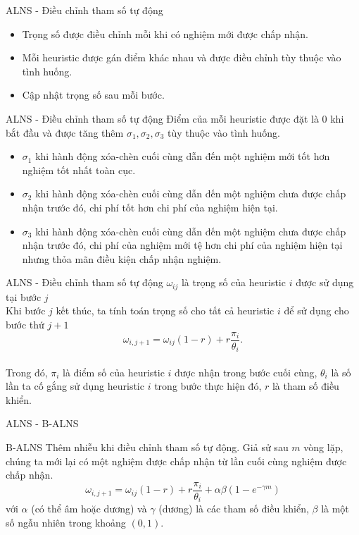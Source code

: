 \begin{frame}{ALNS - Điều chỉnh tham số tự động}
  \begin{itemize}
    \item Trọng số được điều chỉnh mỗi khi có nghiệm mới được chấp nhận.
    \item Mỗi heuristic được gán điểm khác nhau và được điều chỉnh tùy thuộc vào tình huống.
    \item Cập nhật trọng số sau mỗi bước.
  \end{itemize}
\end{frame}

\begin{frame}{ALNS - Điều chỉnh tham số tự động}
  Điểm của mỗi heuristic được đặt là $0$ khi bắt đầu và được tăng thêm $\sigma_1, \sigma_2, \sigma_3$ tùy thuộc vào tình huống.
  \begin{itemize}
    \justifying
    \item $\sigma_1$ khi hành động xóa-chèn cuối cùng dẫn đến một nghiệm mới tốt hơn nghiệm tốt nhất toàn cục.
    \item $\sigma_2$ khi hành động xóa-chèn cuối cùng dẫn đến một nghiệm chưa được chấp nhận trước đó, chi phí tốt hơn chi phí của nghiệm hiện tại.
    \item $\sigma_3$ khi hành động xóa-chèn cuối cùng dẫn đến một nghiệm chưa được chấp nhận trước đó, chi phí của nghiệm mới tệ hơn chi phí của nghiệm hiện tại nhưng thỏa mãn điều kiện chấp nhận nghiệm.
  \end{itemize}
\end{frame}

\begin{frame}{ALNS - Điều chỉnh tham số tự động}
  $\omega_{ij}$ là trọng số của heuristic $i$ được sử dụng tại bước $j$ \\
  Khi bước $j$ kết thúc, ta tính toán trọng số cho tất cả heuristic $i$ để sử dụng cho bước thứ $j + 1$
  \begin{equation}
      \omega_{i, j+1} = \omega_{ij}(1-r)+r\frac{\pi_i}{\theta_i}.
  \end{equation} \\
  Trong đó, $\pi_i$ là điểm số của heuristic $i$ được nhận trong bước cuối cùng, $\theta_i$ là số lần ta cố gắng sử dụng heuristic $i$ trong bước thực hiện đó, $r$ là tham số điều khiển.
\end{frame}

\begin{frame}{ALNS - B-ALNS}
  \begin{block}{B-ALNS}
    Thêm nhiễu khi điều chỉnh tham số tự động. Giả sử sau $m$ vòng lặp, chúng ta mới lại có một nghiệm được chấp nhận từ lần cuối cùng nghiệm được chấp nhận.
    \begin{equation}
      \label{eq:boost_adaptive_weight}
      \omega_{i, j+1} = \omega_{ij}(1-r)+r\frac{\pi_i} {\theta_i} + \alpha \beta (1 - e^{-\gamma m})
    \end{equation}
    với $\alpha$ (có thể âm hoặc dương) và $\gamma$ (dương) là các tham số điều khiển, $\beta$ là một số ngẫu nhiên trong khoảng $(0,1)$.
  \end{block}
\end{frame}

